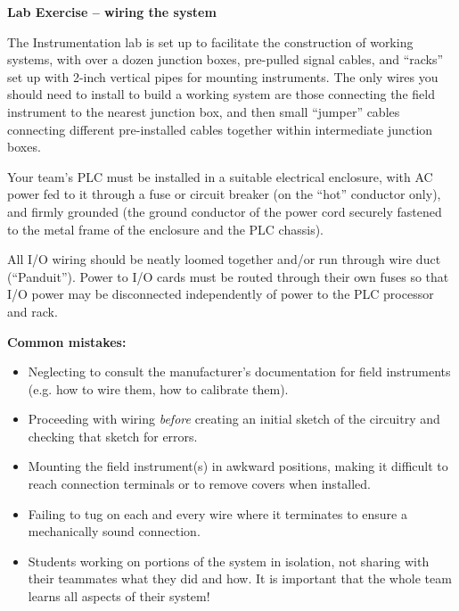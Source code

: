 \vfil \eject

\noindent
{\bf Lab Exercise -- wiring the system}

\vskip 5pt

The Instrumentation lab is set up to facilitate the construction of working systems, with over a dozen junction boxes, pre-pulled signal cables, and ``racks'' set up with 2-inch vertical pipes for mounting instruments.  The only wires you should need to install to build a working system are those connecting the field instrument to the nearest junction box, and then small ``jumper'' cables connecting different pre-installed cables together within intermediate junction boxes.

Your team's PLC must be installed in a suitable electrical enclosure, with AC power fed to it through a fuse or circuit breaker (on the ``hot'' conductor only), and firmly grounded (the ground conductor of the power cord securely fastened to the metal frame of the enclosure and the PLC chassis).

All I/O wiring should be neatly loomed together and/or run through wire duct (``Panduit'').  Power to I/O cards must be routed through their own fuses so that I/O power may be disconnected independently of power to the PLC processor and rack.

\vskip 10pt

{\bf Common mistakes:}

\begin{itemize}
\item{} Neglecting to consult the manufacturer's documentation for field instruments (e.g. how to wire them, how to calibrate them).
\item{} Proceeding with wiring {\it before} creating an initial sketch of the circuitry and checking that sketch for errors.
\item{} Mounting the field instrument(s) in awkward positions, making it difficult to reach connection terminals or to remove covers when installed.
\item{} Failing to tug on each and every wire where it terminates to ensure a mechanically sound connection.
\item{} Students working on portions of the system in isolation, not sharing with their teammates what they did and how.  It is important that the whole team learns all aspects of their system!
\end{itemize}

